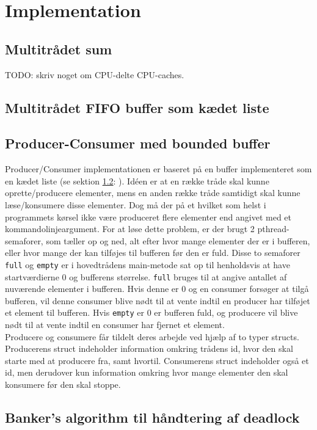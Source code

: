 \section{Implementation}

\subsection{Multitrådet sum}
TODO: skriv noget om CPU-delte CPU-caches.
\subsection{Multitrådet FIFO buffer som kædet liste}
\label{list.c}

\subsection{Producer-Consumer med bounded buffer}
Producer/Consumer implementationen er baseret på en buffer implementeret som en kædet liste (se sektion \ref{list.c}: ). Idéen er at en række tråde skal kunne oprette/producere elementer, mens en anden række tråde samtidigt skal kunne læse/konsumere disse elementer. Dog må der på et hvilket som helst i programmets kørsel ikke være produceret flere elementer end angivet med et kommandolinjeargument. For at løse dette problem, er der brugt 2 pthread-semaforer, som tæller op og ned, alt efter hvor mange elementer der er i bufferen, eller hvor mange der kan tilføjes til bufferen før den er fuld. Disse to semaforer \texttt{full} og \texttt{empty} er i hovedtrådens main-metode sat op til henholdsvis at have startværdierne 0 og bufferens størrelse. \texttt{full} bruges til at angive antallet af nuværende elementer i bufferen. Hvis denne er 0 og en consumer forsøger at tilgå bufferen, vil denne consumer blive nødt til at vente indtil en producer har tilføjet et element til bufferen. Hvis \texttt{empty} er 0 er bufferen fuld, og producere vil blive nødt til at vente indtil en consumer har fjernet et element.\\

Producere og consumere får tildelt deres arbejde ved hjælp af to typer structs. Producerens struct indeholder information omkring trådens id, hvor den skal starte med at producere fra, samt hvortil. Consumerens struct indeholder også et id, men derudover kun information omkring hvor mange elementer den skal konsumere før den skal stoppe.

\subsection{Banker's algorithm til håndtering af deadlock}

